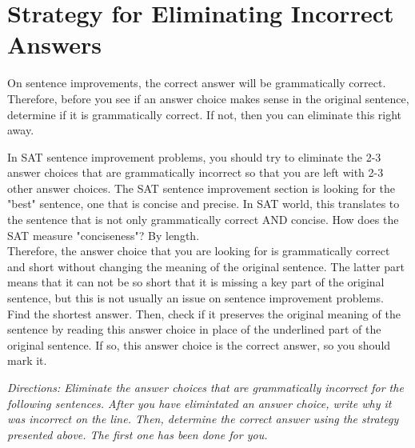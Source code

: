 \section{Strategy for Eliminating Incorrect Answers}

On sentence improvements, the correct answer will be grammatically correct. Therefore, before
you see if an answer choice makes sense in the original sentence, determine if it is grammatically
correct. If not, then you can eliminate this right away.

In SAT sentence improvement problems, you should try to eliminate the 2-3 answer choices that are grammatically incorrect so that you are left with 2-3 other answer choices. The SAT sentence improvement section is looking for the "best" sentence, one that is concise and precise. In SAT world, this translates to the sentence that is not only grammatically correct AND concise. How does the SAT measure "conciseness"? By length. \\

Therefore, the answer choice that you are looking for is grammatically correct and short without changing the meaning of the original sentence. The latter part means that it can not be so short that it is missing a key part of the original sentence,
but this is not usually an issue on sentence improvement problems. \\

Find the shortest answer. Then, check if it preserves the original meaning of the sentence by reading this answer choice in place of the underlined part of the original sentence. If so, this answer choice is the correct answer, so you should mark it.

\bigskip
\textit{Directions: Eliminate the answer choices that are grammatically incorrect for the following sentences. After you have elimintated an answer choice, write why it was incorrect on the line. Then, determine the correct answer using the strategy presented above. The first one has been done for you.}


